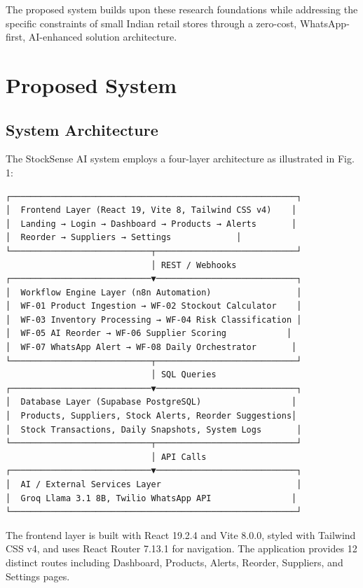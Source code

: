 \documentclass[journal]{IEEEtran}
\begin{document}
The proposed system builds upon these research foundations while addressing the specific constraints of small Indian retail stores through a zero-cost, WhatsApp-first, AI-enhanced solution architecture.

\section{Proposed System}

\subsection{System Architecture}

The StockSense AI system employs a four-layer architecture as illustrated in Fig. 1:

\begin{verbatim}
┌─────────────────────────────────────────────────────────┐
│  Frontend Layer (React 19, Vite 8, Tailwind CSS v4)    │
│  Landing → Login → Dashboard → Products → Alerts       │
│  Reorder → Suppliers → Settings             │
└────────────────────────────┬────────────────────────────┘
                             │ REST / Webhooks
┌────────────────────────────▼────────────────────────────┐
│  Workflow Engine Layer (n8n Automation)                 │
│  WF-01 Product Ingestion → WF-02 Stockout Calculator    │
│  WF-03 Inventory Processing → WF-04 Risk Classification │
│  WF-05 AI Reorder → WF-06 Supplier Scoring            │
│  WF-07 WhatsApp Alert → WF-08 Daily Orchestrator       │
└────────────────────────────┬────────────────────────────┘
                             │ SQL Queries
┌────────────────────────────▼────────────────────────────┐
│  Database Layer (Supabase PostgreSQL)                  │
│  Products, Suppliers, Stock Alerts, Reorder Suggestions│
│  Stock Transactions, Daily Snapshots, System Logs       │
└────────────────────────────┬────────────────────────────┘
                             │ API Calls
┌────────────────────────────▼────────────────────────────┐
│  AI / External Services Layer                           │
│  Groq Llama 3.1 8B, Twilio WhatsApp API                │
└─────────────────────────────────────────────────────────┘
\end{verbatim}

The frontend layer is built with React 19.2.4 and Vite 8.0.0, styled with Tailwind CSS v4, and uses React Router 7.13.1 for navigation. The application provides 12 distinct routes including Dashboard, Products, Alerts, Reorder, Suppliers, and Settings pages.
\end{document}
